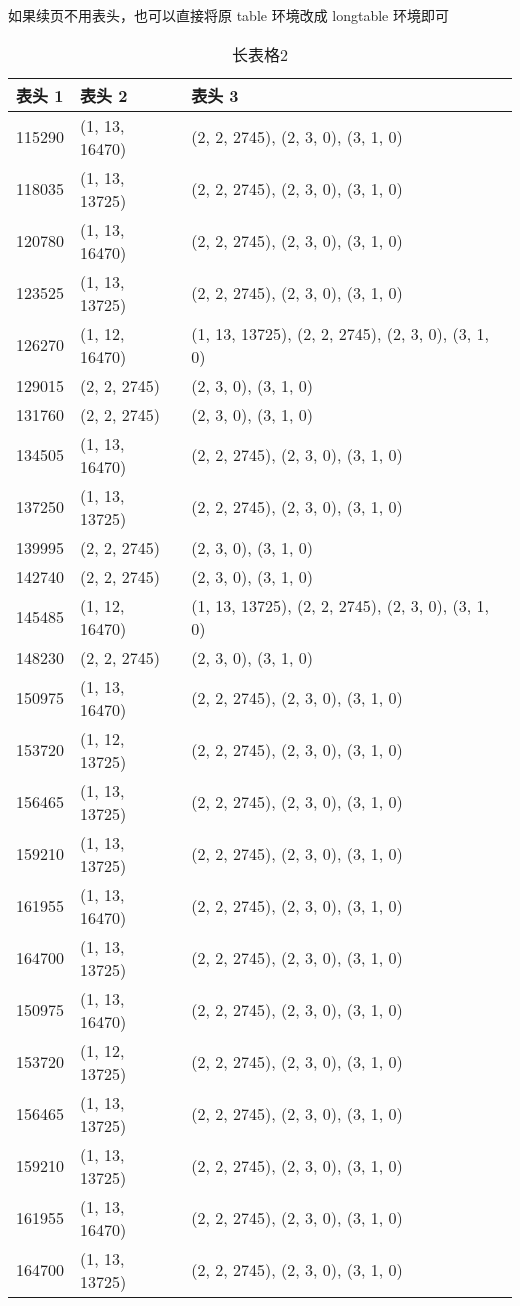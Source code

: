 如果续页不用表头，也可以直接将原 table 环境改成 longtable 环境即可
\begin{longtable}[htbp]{|l|l|l|}
\caption{长表格2} \label{grid_mlmmh} \\
\hline
表头 1 & 表头 2 & 表头 3\\
\hline
115290 & (1, 13, 16470) & (2, 2, 2745), (2, 3, 0), (3, 1, 0) \\
118035 & (1, 13, 13725) & (2, 2, 2745), (2, 3, 0), (3, 1, 0) \\
120780 & (1, 13, 16470) & (2, 2, 2745), (2, 3, 0), (3, 1, 0) \\
123525 & (1, 13, 13725) & (2, 2, 2745), (2, 3, 0), (3, 1, 0) \\
126270 & (1, 12, 16470) & (1, 13, 13725), (2, 2, 2745), (2, 3, 0), (3, 1, 0) \\
129015 & (2, 2, 2745) & (2, 3, 0), (3, 1, 0) \\
131760 & (2, 2, 2745) & (2, 3, 0), (3, 1, 0) \\
134505 & (1, 13, 16470) & (2, 2, 2745), (2, 3, 0), (3, 1, 0) \\
137250 & (1, 13, 13725) & (2, 2, 2745), (2, 3, 0), (3, 1, 0) \\
139995 & (2, 2, 2745) & (2, 3, 0), (3, 1, 0) \\
142740 & (2, 2, 2745) & (2, 3, 0), (3, 1, 0) \\
145485 & (1, 12, 16470) & (1, 13, 13725), (2, 2, 2745), (2, 3, 0), (3, 1, 0) \\
148230 & (2, 2, 2745) & (2, 3, 0), (3, 1, 0) \\
150975 & (1, 13, 16470) & (2, 2, 2745), (2, 3, 0), (3, 1, 0) \\
153720 & (1, 12, 13725) & (2, 2, 2745), (2, 3, 0), (3, 1, 0) \\
156465 & (1, 13, 13725) & (2, 2, 2745), (2, 3, 0), (3, 1, 0) \\
159210 & (1, 13, 13725) & (2, 2, 2745), (2, 3, 0), (3, 1, 0) \\
161955 & (1, 13, 16470) & (2, 2, 2745), (2, 3, 0), (3, 1, 0) \\
164700 & (1, 13, 13725) & (2, 2, 2745), (2, 3, 0), (3, 1, 0) \\
150975 & (1, 13, 16470) & (2, 2, 2745), (2, 3, 0), (3, 1, 0) \\
153720 & (1, 12, 13725) & (2, 2, 2745), (2, 3, 0), (3, 1, 0) \\
156465 & (1, 13, 13725) & (2, 2, 2745), (2, 3, 0), (3, 1, 0) \\
159210 & (1, 13, 13725) & (2, 2, 2745), (2, 3, 0), (3, 1, 0) \\
161955 & (1, 13, 16470) & (2, 2, 2745), (2, 3, 0), (3, 1, 0) \\
164700 & (1, 13, 13725) & (2, 2, 2745), (2, 3, 0), (3, 1, 0) \\
\hline
\end{longtable}


